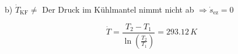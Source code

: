 b) $\dot{T}_{\text{KF}} \neq$ Der Druck im Kühlmantel nimmt nicht ab $\Rightarrow \dot{s}_{\text{ez}} = 0$

\[
\dot{T} = \frac{T_2 - T_1}{\ln \left( \frac{T_2}{T_1} \right)} = 293.12 \, K
\]